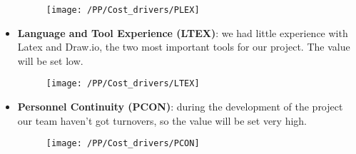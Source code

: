 \begin{itemize}
    \begin{figure}[!ht]
      \centering
      \vspace{0.2cm}
      \texttt{[image: /PP/Cost\_drivers/PLEX]}\\
      \vspace{0.2cm}
      \label{fig:PLEX} 
    \end{figure}  
    \item \textbf{Language and Tool Experience (LTEX)}: we had little experience with Latex and Draw.io, the two most important tools for our project. The value will be set low. 
    \begin{figure}[!ht]
      \centering
      \vspace{0.2cm}
      \texttt{[image: /PP/Cost\_drivers/LTEX]}\\
      \vspace{0.2cm}
      \label{fig:LTEX} 
    \end{figure}  
    \item \textbf{Personnel Continuity (PCON)}: during the development of the project our team haven't got turnovers, so the value will be set very high.
    \begin{figure}[!ht]
      \centering
      \vspace{0.2cm}
      \texttt{[image: /PP/Cost\_drivers/PCON]}\\
      \vspace{0.2cm}
      \label{fig:PCON} 
    \end{figure}  
\end{itemize}

